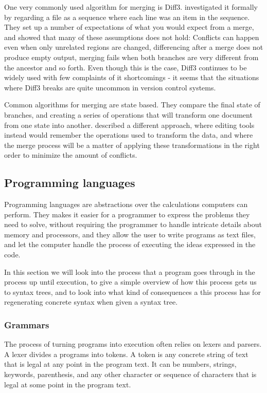 \documentclass[11pt]{article}
\begin{document}
One very commonly used algorithm for merging is Diff3. \citet{Khanna} investigated it formally by regarding a file as a sequence where each line was an item in the sequence. They set up a number of expectations of what you would expect from a merge, and showed that many of these assumptions does not hold: Conflicts can happen even when only unrelated regions are changed, differencing after a merge does not produce empty output, merging fails when both branches are very different from the ancestor and so forth. Even though this is the case, Diff3 continues to be widely used with few complaints of it shortcomings - it seems that the situations where Diff3 breaks are quite uncommon in version control systems.

Common algorithms for merging are state based. They compare the final state of branches, and creating a series of operations that will transform one document from one state into another. \citet{Lippe} described a different approach, where editing tools instead would remember the operations used to transform the data, and where the merge process will be a matter of applying these transformations in the right order to minimize the amount of conflicts.



\subsection{Programming languages}
Programming languages are abstractions over the calculations computers can perform. They makes it easier for a programmer to express the problems they need to solve, without requiring the programmer to handle intricate details about memory and processors, and they allow the user to write programs as text files, and let the computer handle the process of executing the ideas expressed in the code.

In this section we will look into the process that a program goes through in the process up until execution, to give a simple overview of how this process gets us to syntax trees, and to look into what kind of consequences a this process has for regenerating concrete syntax when given a syntax tree.

\subsubsection{Grammars}
The process of turning programs into execution often relies on lexers and parsers. A lexer divides a programs into tokens. A token is any concrete string of text that is legal at any point in the program text. It can be numbers, strings, keywords, parenthesis, and any other character or sequence of characters that is legal at some point in the program text. 
\end{document}
